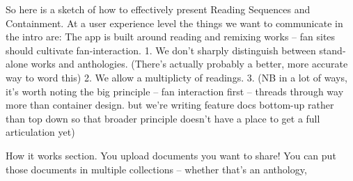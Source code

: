 \documentclass{article}
\begin{document}
So here is a sketch of how to effectively present Reading Sequences and Containment. At a user experience level the things we want to communicate in the intro are: 
The app is built around reading and remixing works -- fan sites should cultivate fan-interaction. 
1. We don't sharply distinguish between stand-alone works and anthologies. (There's actually probably a better, more accurate way to word this)
2. We allow a multiplicty of readings. 
3. (NB in a lot of ways, it's worth noting the big principle -- fan interaction first -- threads through way more than container design. but we're writing feature docs bottom-up rather than top down so that broader principle doesn't have a place to get a full articulation yet)

How it works section. 
You upload documents you want to share! You can put those documents in multiple collections -- whether that's an anthology,  
\end{document}
